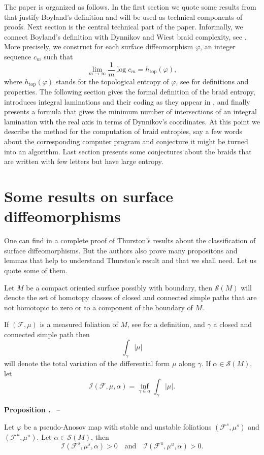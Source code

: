 \documentclass[a4paper, 11pt, leqno]{article}
\newcommand{\htop}{h_{\text{top}}}
\newcommand{\s}{\mathscr S}
\newcommand{\F}{\mathcal F}
\newcommand{\I}{\mathscr I}
\newcounter{prop}[section]
\renewcommand{\theprop}{\arabic{section}.\arabic{prop}}
\newenvironment{prop}[0]%
{\refstepcounter{prop}\vspace{10pt}\par\noindent 
{\bf Proposition \theprop} \ -- \ 
\begin{itshape}}%
{\end{itshape}\par\vspace{0.2cm}}
\newcounter{ex}[section]
\newcounter{conj}[section]
\begin{document}
The paper is organized as follows. In the first section we quote
some results from \cite{FLP} that justify Boyland's definition and
will be used as technical components of proofs. Next section is the
central technical part of the paper. Informally, we connect Boyland's
definition with Dynnikov and Wiest braid complexity, see \cite{CB}. 
More precisely, we construct for each surface diffeomorphism
$\varphi$, an integer sequence $c_m$ such that 
$$
\lim_{m\rightarrow \infty} \frac{1}{m} \log c_m = \htop (\varphi),
$$
where $\htop (\varphi)$ stands for the topological entropy of
$\varphi$, see \cite{KH} for definitions and properties. The following
section gives the formal definition of the braid entropy, introduces
integral laminations and their coding as they appear in \cite{YB}, and
finally presents a formula that gives the minimum number of
intersections of an integral lamination with the real axis in terms of
Dynnikov's coordinates. At this point we describe the method for
the computation of braid entropies, say a few words about the
corresponding computer program and conjecture it might be turned 
into an algorithm. Last section presents some conjectures about the braids 
that are written with few letters but have large entropy.

\section{Some results on surface diffeomorphisms}
One can find in \cite{FLP} a complete proof of Thurston's results
about the classification of surface diffeomorphisms. But the authors also
prove many propositons and lemmas that help to understand Thurston's
result and that we shall need. Let us quote some of them.

Let  $M$ be a compact oriented surface possibly with boundary, then 
$\s(M)$ will denote the set of homotopy classes of closed and connected 
simple paths that are not homotopic to zero or to a component of 
the boundary of $M$.

If $(\F, \mu)$ is a measured foliation of $M$, see \cite{FLP} for 
a definition, and $\gamma$ a closed and connected simple path then
$$
\int_\gamma |\mu|
$$
will denote the total variation of the differential form $\mu$ along
$\gamma$. If $\alpha \in \s(M)$, let
$$
\I(\F,\mu,\alpha) = \inf_{\gamma \in \alpha} \int_{\gamma} |\mu|.
$$

\begin{prop}
  Let $\varphi$ be a pseudo-Anosov map with stable and unstable
  foliations $(\F^s, \mu^s)$ and $(\F^u, \mu^u)$. Let $\alpha \in
  \s(M)$, then 
  $$
  \I(\F^s,\mu^s,\alpha)>0 \quad \text{and} 
  \quad \I(\F^u,\mu^u,\alpha) >0.
  $$
\end{prop}
\end{document}
